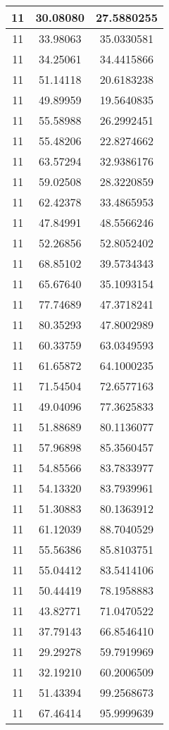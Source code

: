 \documentclass[
]{book}
\begin{document}
\begin{tabular}{c|c|c}
\hline
11 & 30.08080 & 27.5880255\\
\hline
11 & 33.98063 & 35.0330581\\
\hline
11 & 34.25061 & 34.4415866\\
\hline
11 & 51.14118 & 20.6183238\\
\hline
11 & 49.89959 & 19.5640835\\
\hline
11 & 55.58988 & 26.2992451\\
\hline
11 & 55.48206 & 22.8274662\\
\hline
11 & 63.57294 & 32.9386176\\
\hline
11 & 59.02508 & 28.3220859\\
\hline
11 & 62.42378 & 33.4865953\\
\hline
11 & 47.84991 & 48.5566246\\
\hline
11 & 52.26856 & 52.8052402\\
\hline
11 & 68.85102 & 39.5734343\\
\hline
11 & 65.67640 & 35.1093154\\
\hline
11 & 77.74689 & 47.3718241\\
\hline
11 & 80.35293 & 47.8002989\\
\hline
11 & 60.33759 & 63.0349593\\
\hline
11 & 61.65872 & 64.1000235\\
\hline
11 & 71.54504 & 72.6577163\\
\hline
11 & 49.04096 & 77.3625833\\
\hline
11 & 51.88689 & 80.1136077\\
\hline
11 & 57.96898 & 85.3560457\\
\hline
11 & 54.85566 & 83.7833977\\
\hline
11 & 54.13320 & 83.7939961\\
\hline
11 & 51.30883 & 80.1363912\\
\hline
11 & 61.12039 & 88.7040529\\
\hline
11 & 55.56386 & 85.8103751\\
\hline
11 & 55.04412 & 83.5414106\\
\hline
11 & 50.44419 & 78.1958883\\
\hline
11 & 43.82771 & 71.0470522\\
\hline
11 & 37.79143 & 66.8546410\\
\hline
11 & 29.29278 & 59.7919969\\
\hline
11 & 32.19210 & 60.2006509\\
\hline
11 & 51.43394 & 99.2568673\\
\hline
11 & 67.46414 & 95.9999639\\

\end{tabular}
\end{document}
